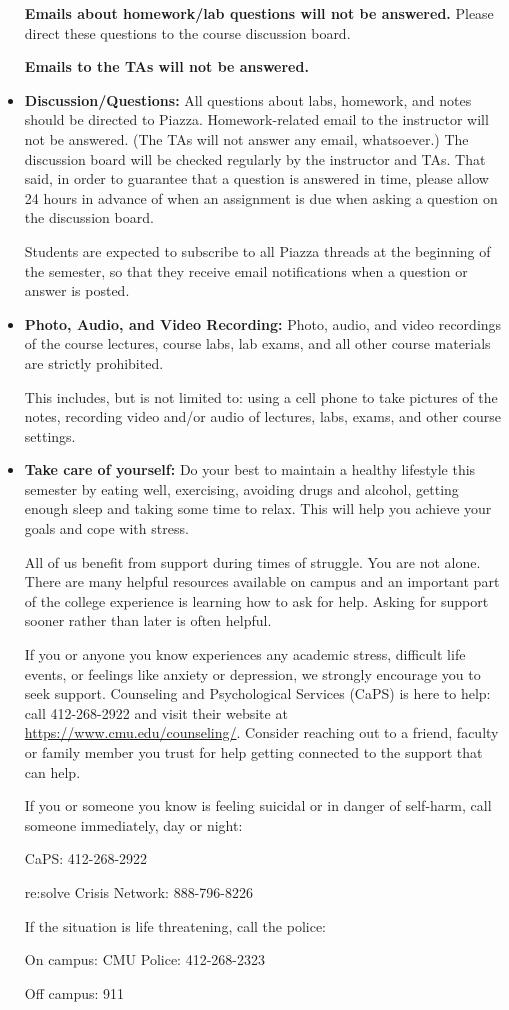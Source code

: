 \documentclass[11pt]{article}
\begin{document}
\begin{itemize}
\textbf{Emails about homework/lab questions will not be answered.}  Please direct these questions to the course discussion board.
	
\textbf{Emails to the TAs will not be answered.}


\item {\bf Discussion/Questions:}  All questions about labs, homework, and notes should be directed to Piazza.  Homework-related email to the instructor will not be answered.  (The TAs will not answer any email, whatsoever.)  The discussion board will be checked regularly by the instructor and TAs.  That said, in order to guarantee that a question is answered in time, please allow 24 hours in advance of when an assignment is due when asking a question on the discussion board.

Students are expected to subscribe to all Piazza threads at the beginning of the semester, so that they receive email notifications when a question or answer is posted.

\item {\bf Photo, Audio, and Video Recording:}  Photo, audio, and video recordings of the course lectures, course labs, lab exams, and all other course materials are strictly prohibited.

This includes, but is not limited to:  using a cell phone to take pictures of the notes, recording video and/or audio of lectures, labs, exams, and other course settings.  

\item {\bf Take care of yourself:}  Do your best to maintain a healthy lifestyle this semester by eating well, exercising, avoiding drugs and alcohol, getting enough sleep and taking some time to relax. This will help you achieve your goals and cope with stress.

All of us benefit from support during times of struggle. You are not alone. There are many helpful resources available on campus and an important part of the college experience is learning how to ask for help. Asking for support sooner rather than later is often helpful.

If you or anyone you know experiences any academic stress, difficult life events, or feelings like anxiety or depression, we strongly encourage you to seek support. Counseling and Psychological Services (CaPS) is here to help: call 412-268-2922 and visit their website at \url{https://www.cmu.edu/counseling/}. Consider reaching out to a friend, faculty or family member you trust for help getting connected to the support that can help.

If you or someone you know is feeling suicidal or in danger of self-harm, call someone immediately, day or night:

CaPS: 412-268-2922

re:solve Crisis Network: 888-796-8226

If the situation is life threatening, call the police:

On campus: CMU Police: 412-268-2323

Off campus: 911

\end{itemize}
\end{document}
